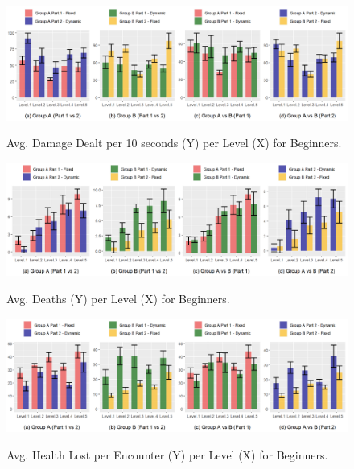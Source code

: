 \begin{figure}[!ht]
    \begin{center}
    \caption{Avg. Damage Dealt per 10 seconds (Y) per Level (X) for Beginners.}
        \includegraphics[width=34em]{figures/damage_dealt_per_10s-beginner_players.png}
        \label{fig:result-metric-beginners-damage-dealt-per-10s}
    \end{center}
\end{figure}

\begin{figure}[!ht]
    \begin{center}
    \caption{Avg. Deaths (Y) per Level (X) for Beginners.}
        \includegraphics[width=34em]{figures/deaths_per_level-beginner_players.png}
        \label{fig:result-metric-beginners-deaths-per-level}
    \end{center}
\end{figure}

\begin{figure}[!ht]
    \begin{center}
    \caption{Avg. Health Lost per Encounter (Y) per Level (X) for Beginners.}
        \includegraphics[width=34em]{figures/health_lost_per_encounter-beginner_players.png}
        \label{fig:result-metric-beginners-health-lost-per-encounter}
    \end{center}
\end{figure}

